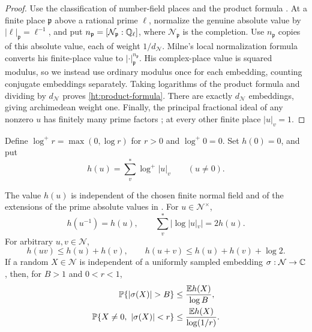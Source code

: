\begin{proof}
Use the classification of number-field places and the product formula
\cite[Theorems~7.14--7.15]{ProductFormula}. At a finite place
\(\mathfrak p\) above a rational prime \(\ell\), normalize the genuine
absolute value by \(|\ell|_{\mathfrak p}=\ell^{-1}\), and put
\(n_{\mathfrak p}=[\mathcal N_{\mathfrak p}:\mathbb Q_\ell]\), where
\(\mathcal N_{\mathfrak p}\) is the completion. Use
\(n_{\mathfrak p}\) copies of this absolute value, each of weight
\(1/d_{\mathcal N}\). Milne's local normalization formula
\cite[Lemma~8.6]{ProductFormula} converts his finite-place value to
\(|\cdot|_{\mathfrak p}^{n_{\mathfrak p}}\). His complex-place value
is squared modulus, so we instead use ordinary modulus once for each
embedding, counting conjugate embeddings separately. Taking logarithms
of the product formula and dividing by \(d_{\mathcal N}\) proves
\eqref{ht:product-formula}. There are exactly \(d_{\mathcal N}\)
embeddings, giving archimedean weight one. Finally, the principal
fractional ideal of any nonzero \(u\) has finitely many prime factors
\cite[Theorem~3.20]{ProductFormula}; at every other finite place
\(|u|_v=1\).
\end{proof}

Define $\log^+r=\max(0,\log r)$ for $r>0$ and $\log^+0=0$.
Set $h(0)=0$, and put
\[
 h(u)=\sum_v^*\log^+|u|_v\qquad(u\ne0).
\]

\begin{lemma}\label{ht:height}
The value $h(u)$ is independent of the chosen finite normal field and of
the extensions of the prime absolute values in .
For $u\in\mathcal N^\times$,
\begin{equation}\label{ht:height-inversion}
 h(u^{-1})=h(u),\qquad
 \sum_v^*|\log|u|_v|=2h(u).
\end{equation}
For arbitrary $u,v\in\mathcal N$,
\begin{equation}\label{ht:height-inequalities}
 h(uv)\le h(u)+h(v),\qquad
 h(u+v)\le h(u)+h(v)+\log2.
\end{equation}
If a random $X\in\mathcal N$ is independent of a uniformly sampled
embedding $\sigma:\mathcal N\to\mathbb C$, then, for $B>1$ and $0<r<1$,
\begin{align}
 \Prob\{|\sigma(X)|>B\}&\le\frac{\E h(X)}{\log B},
       \label{ht:large-tail}\\
 \Prob\{X\ne0,\ |\sigma(X)|<r\}
      &\le\frac{\E h(X)}{\log(1/r)}.
       \label{ht:small-tail}
\end{align}
\end{lemma}

